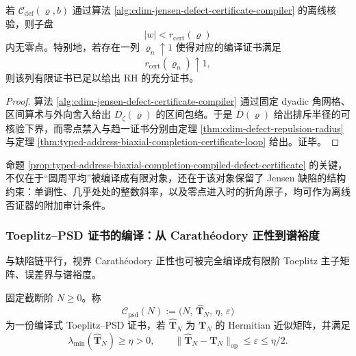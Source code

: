 \begin{proposition}[缺陷证书的禁入语义]\label{prop:typed-address-biaxial-completion-compiled-defect-certificate}
若 \(\mathcal C_{\mathrm{def}}(\varrho,b)\) 通过算法 \ref{alg:cdim-jensen-defect-certificate-compiler} 的离线核验，则子盘
\[
|w|<r_{\mathrm{cert}}(\varrho)
\]
内无零点。特别地，若存在一列 \(\varrho_n\uparrow 1\) 使得对应的编译证书满足
\[
r_{\mathrm{cert}}(\varrho_n)\uparrow 1,
\]
则该列有限证书已足以给出 RH 的充分证书。
\end{proposition}
\begin{proof}
算法 \ref{alg:cdim-jensen-defect-certificate-compiler} 通过固定 dyadic 角网格、区间算术与外向舍入给出 \(D_{\zeta}(\varrho)\) 的区间包络。于是 \(\overline D(\varrho)\) 给出排斥半径的可核验下界，而零点禁入与趋一证书分别由定理 \ref{thm:cdim-defect-repulsion-radius} 与定理 \ref{thm:typed-address-biaxial-completion-certificate-loop} 给出。证毕。
\end{proof}

命题 \ref{prop:typed-address-biaxial-completion-compiled-defect-certificate} 的关键，不仅在于“圆周平均”被编译成有限对象，还在于该对象保留了 Jensen 缺陷的结构约束：单调性、几乎处处的整数斜率，以及零点进入时的折角原子，均可作为离线否证器的附加审计条件。

\subsubsection{Toeplitz--PSD 证书的编译：从 Carath\'eodory 正性到谱裕度}\label{subsubsec:typed-address-biaxial-completion-compiled-psd-certificate}
与缺陷链平行，视界 Carath\'eodory 正性也可被完全编译成有限阶 Toeplitz 主子矩阵、误差界与谱裕度。

\begin{definition}\label{def:typed-address-biaxial-completion-compiled-psd-certificate}
固定截断阶 \(N\ge 0\)。称
\[
\mathcal C_{\mathrm{psd}}(N)
:=
\bigl(
N,\,
\widehat{\mathbf{T}}_N,\,
\eta,\,
\varepsilon
\bigr)
\]
为一份编译式 Toeplitz--PSD 证书，若 \(\widehat{\mathbf{T}}_N\) 为 \(\mathbf{T}_N\) 的 Hermitian 近似矩阵，并满足
\[
\lambda_{\min}(\widehat{\mathbf{T}}_N)\ge \eta>0,
\qquad
\|\widehat{\mathbf{T}}_N-\mathbf{T}_N\|_{\mathrm{op}}\le \varepsilon\le \eta/2.
\]
\end{definition}


